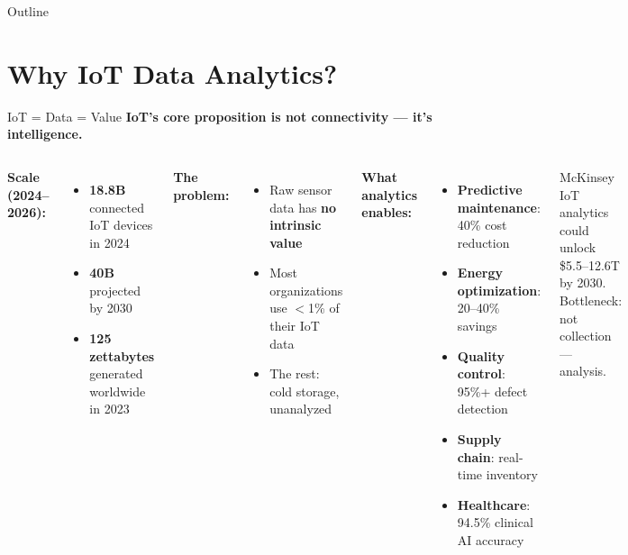\documentclass[aspectratio=169,11pt]{beamer}
\begin{document}
\begin{frame}{Outline}
    \tableofcontents
\end{frame}

\section{Why IoT Data Analytics?}

\begin{frame}{IoT = Data = Value}
    \small
    \textbf{IoT's core proposition is not connectivity --- it's intelligence.}

    \vspace{0.05cm}
    \begin{columns}
        \textbf{Scale (2024--2026):}
        \begin{itemize}\setlength{\itemsep}{0pt}
            \item \textbf{18.8B} connected IoT devices in 2024
            \item \textbf{40B} projected by 2030
            \item \textbf{125 zettabytes} generated worldwide in 2023
        \end{itemize}

        \vspace{0.05cm}
        \textbf{The problem:}
        \begin{itemize}\setlength{\itemsep}{0pt}
            \item Raw sensor data has \textbf{no intrinsic value}
            \item Most organizations use $<$1\% of their IoT data
            \item The rest: cold storage, unanalyzed
        \end{itemize}

        \textbf{What analytics enables:}
        \begin{itemize}\setlength{\itemsep}{0pt}
            \item \textbf{Predictive maintenance}: 40\% cost reduction
            \item \textbf{Energy optimization}: 20--40\% savings
            \item \textbf{Quality control}: 95\%+ defect detection
            \item \textbf{Supply chain}: real-time inventory
            \item \textbf{Healthcare}: 94.5\% clinical AI accuracy
        \end{itemize}

        \vspace{0.05cm}
        \begin{alertblock}{McKinsey}
            IoT analytics could unlock \$5.5--12.6T by 2030. Bottleneck: not collection --- analysis.
        \end{alertblock}
    \end{columns}
\end{frame}
\end{document}
